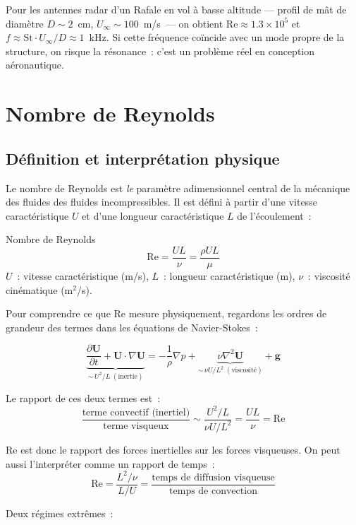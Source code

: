 \documentclass[11pt,a4paper]{report}
\newcommand{\pd}[2]{\dfrac{\partial #1}{\partial #2}}
\begin{document}
Pour les antennes radar d'un Rafale en vol à basse altitude --- profil de mât
de diamètre $D\sim 2$~cm, $U_\infty\sim 100$~m/s~--- on obtient
$\mathrm{Re} \approx 1.3\times10^5$ et $f \approx \mathrm{St}\cdot U_\infty/D \approx 1$~kHz.
Si cette fréquence coïncide avec un mode propre de la structure, on risque
la résonance~: c'est un problème réel en conception aéronautique.

\section{Nombre de Reynolds}

\subsection{Définition et interprétation physique}

Le nombre de Reynolds est \emph{le} paramètre adimensionnel central de la
mécanique des fluides des fluides incompressibles. Il est défini à partir
d'une vitesse caractéristique $U$ et d'une longueur caractéristique $L$
de l'écoulement~:

\begin{defbox}{Nombre de Reynolds}
\[
    \mathrm{Re} = \frac{UL}{\nu} = \frac{\rho UL}{\mu}
\]
$U$~: vitesse caractéristique (m/s),
$L$~: longueur caractéristique (m),
$\nu$~: viscosité cinématique (m$^2$/s).
\end{defbox}

Pour comprendre ce que Re mesure physiquement, regardons les ordres de grandeur
des termes dans les équations de Navier-Stokes~:

\[
\underbrace{\pd{\bm{U}}{t} + \bm{U}\cdot\nabla\bm{U}}_{\sim\,U^2/L\;(\text{inertie})}
= -\frac{1}{\rho}\nabla p + \underbrace{\nu\nabla^2\bm{U}}_{\sim\,\nu U/L^2\;(\text{viscosité})} + \bm{g}
\]

Le rapport de ces deux termes est~:
\[
    \frac{\text{terme convectif (inertiel)}}{\text{terme visqueux}}
    \sim \frac{U^2/L}{\nu U/L^2} = \frac{UL}{\nu} = \mathrm{Re}
\]

Re est donc le rapport des forces inertielles sur les forces visqueuses.
On peut aussi l'interpréter comme un rapport de temps~:
\[
    \mathrm{Re} = \frac{L^2/\nu}{L/U}
    = \frac{\text{temps de diffusion visqueuse}}{\text{temps de convection}}
\]

\medskip
\noindent Deux régimes extrêmes~:
\end{document}

